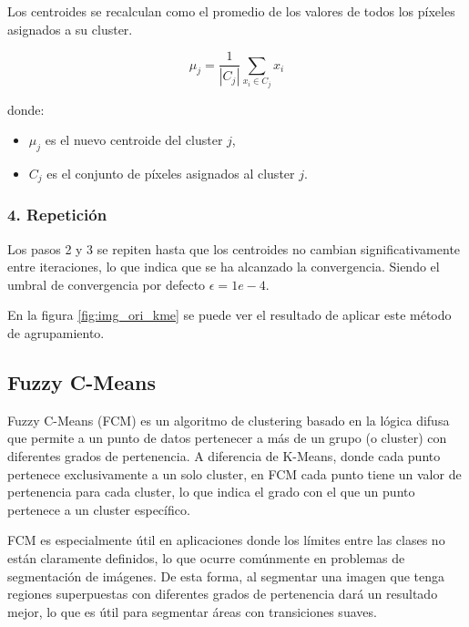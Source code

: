 Los centroides se recalculan como el promedio de los valores de todos los píxeles asignados a su cluster.

$$\mu_j =\frac{1}{|C_j |}\sum_{x_i \in C_j } x_i$$

donde:

\begin{itemize}
\setlength{\itemsep}{-1ex}
   \item{\begin{flushleft} $\mu_j$ es el nuevo centroide del cluster $j$, \end{flushleft}}
   \item{\begin{flushleft} $C_j$ es el conjunto de píxeles asignados al cluster $j$. \end{flushleft}}
\end{itemize}

\subsubsection{4. Repetición}

Los pasos 2 y 3 se repiten hasta que los centroides no cambian significativamente entre iteraciones, lo que indica que se ha alcanzado la convergencia. Siendo el umbral de convergencia por defecto $\epsilon =1e-4$.

En la figura \ref{fig:img_ori_kme} se puede ver el resultado de aplicar este método de agrupamiento.

\subsection{Fuzzy C-Means}\label{fuzzy-c-means}
Fuzzy C-Means (FCM) \cite{MATLAB:2023bFuzzy} es un algoritmo de clustering basado en la lógica difusa que permite a un punto de datos pertenecer a más de un grupo (o cluster) con diferentes grados de pertenencia. A diferencia de K-Means, donde cada punto pertenece exclusivamente a un solo cluster, en FCM cada punto tiene un valor de pertenencia para cada cluster, lo que indica el grado con el que un punto pertenece a un cluster específico.

FCM es especialmente útil en aplicaciones donde los límites entre las clases no están claramente definidos, lo que ocurre comúnmente en problemas de segmentación de imágenes. De esta forma, al segmentar una imagen que tenga regiones superpuestas con diferentes grados de pertenencia dará un resultado mejor, lo que es útil para segmentar áreas con transiciones suaves.

